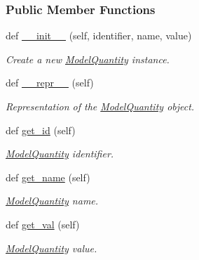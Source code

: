 \subsubsection*{Public Member Functions}
\begin{DoxyCompactItemize}
\item 
def \mbox{\hyperlink{classamici_1_1ode__export_1_1_model_quantity_a258843a3afab00b576ccf386e8673a64}{\+\_\+\+\_\+init\+\_\+\+\_\+}} (self, identifier, name, value)
\begin{DoxyCompactList}\small\item\em Create a new \mbox{\hyperlink{classamici_1_1ode__export_1_1_model_quantity}{Model\+Quantity}} instance. \end{DoxyCompactList}\item 
def \mbox{\hyperlink{classamici_1_1ode__export_1_1_model_quantity_a9a47563093dfc5ba12274b66e368920c}{\+\_\+\+\_\+repr\+\_\+\+\_\+}} (self)
\begin{DoxyCompactList}\small\item\em Representation of the \mbox{\hyperlink{classamici_1_1ode__export_1_1_model_quantity}{Model\+Quantity}} object. \end{DoxyCompactList}\item 
def \mbox{\hyperlink{classamici_1_1ode__export_1_1_model_quantity_a52cfbb3619e7f1360e8dc7cb0e90635b}{get\+\_\+id}} (self)
\begin{DoxyCompactList}\small\item\em \mbox{\hyperlink{classamici_1_1ode__export_1_1_model_quantity}{Model\+Quantity}} identifier. \end{DoxyCompactList}\item 
def \mbox{\hyperlink{classamici_1_1ode__export_1_1_model_quantity_ae13ea075e8de9101d02c0316ccb2ce79}{get\+\_\+name}} (self)
\begin{DoxyCompactList}\small\item\em \mbox{\hyperlink{classamici_1_1ode__export_1_1_model_quantity}{Model\+Quantity}} name. \end{DoxyCompactList}\item 
def \mbox{\hyperlink{classamici_1_1ode__export_1_1_model_quantity_a5a59c7fdd0ea17bac5a6b07db3f027c5}{get\+\_\+val}} (self)
\begin{DoxyCompactList}\small\item\em \mbox{\hyperlink{classamici_1_1ode__export_1_1_model_quantity}{Model\+Quantity}} value. \end{DoxyCompactList}\end{DoxyCompactItemize}


